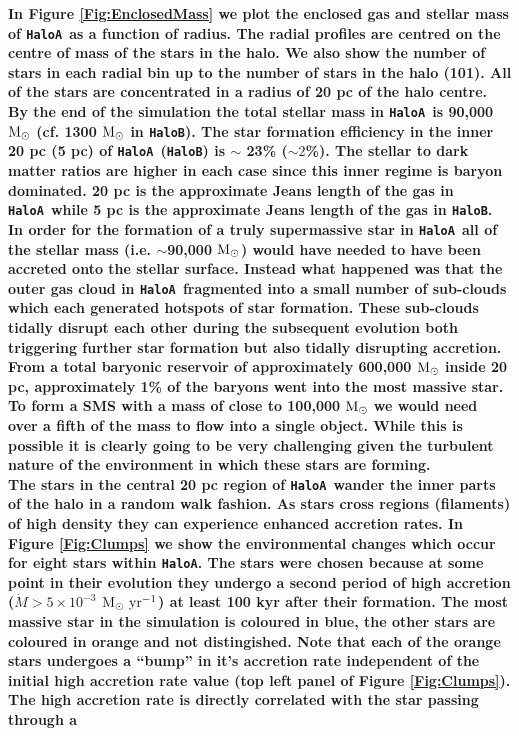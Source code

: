 \documentclass[twocolumn,iop,revtex4]{openjournal}
\newcommand{\msolar} {$\rm{M_{\odot}}~$}
\newcommand{\msolarc} {$\rm{M_{\odot}}$}
\newcommand{\msolaryrc} {$\rm{M_{\odot}~yr^{-1}}$}
\newcommand{\ha} {\texttt{HaloA~}}
\newcommand{\hac} {\texttt{HaloA}}
\newcommand{\hbc} {\texttt{HaloB}}
\begin{document}
\noindent \textbf{In Figure \ref{Fig:EnclosedMass} we plot the enclosed gas and stellar mass of \ha as a function of radius.
The radial profiles are centred on the centre of mass of the stars in the halo. We also show the
number of stars in each radial bin up to the number of stars in the halo (101). All of the stars
are concentrated in a radius of 20 pc of the halo centre. By the end of the simulation the total stellar mass
in \ha is 90,000 \msolar (cf. 1300
\msolar in \hbc). The star formation efficiency in the inner 20 pc (5 pc) of \ha (\hbc) is $\sim$ 23\%
($\sim 2$\%). The stellar to dark matter ratios are higher in each case since this 
inner regime is baryon dominated. 20 pc is the approximate Jeans length of the gas in \ha while 5 pc is the approximate Jeans
length of the gas in \hbc. In order for the formation of a truly supermassive star in \ha all of the
stellar mass
(i.e. $\sim$90,000 \msolarc) would have needed to have been accreted onto the stellar surface. Instead
what happened was that the outer gas cloud in \ha fragmented into a small number of sub-clouds which
each generated hotspots of star formation. These sub-clouds tidally disrupt each other during the
subsequent evolution both triggering further star formation but also tidally disrupting accretion.
From a total baryonic reservoir of approximately 600,000 \msolar inside 20 pc, approximately 1\% of the baryons went
into the most massive star. To form a SMS
with a mass of close to 100,000 \msolar we would need over a fifth of the mass to 
flow into a single object. While this is possible it is clearly going to be 
very challenging given the turbulent nature of the environment in which these stars are forming. \\
\indent The stars in the central 20 pc region of \ha wander the inner parts of the halo in a random walk fashion. As
stars cross regions (filaments) of high density they can experience enhanced accretion rates. In Figure
\ref{Fig:Clumps} we show the environmental changes which occur for eight stars within \hac. The stars were
chosen because at some point in their evolution they undergo a second period of high accretion
($\dot{M} > 5 \times 10^{-3}$ \msolaryrc) at least 100 kyr after their formation.
The most massive star in the simulation is coloured in blue, the
other stars are coloured in orange and not distingished. Note that each of the orange stars undergoes
a ``bump'' in it's accretion rate independent of the initial high accretion rate value (top left panel
of Figure \ref{Fig:Clumps}). The high accretion rate is directly correlated with the star passing through a
}
\end{document}
